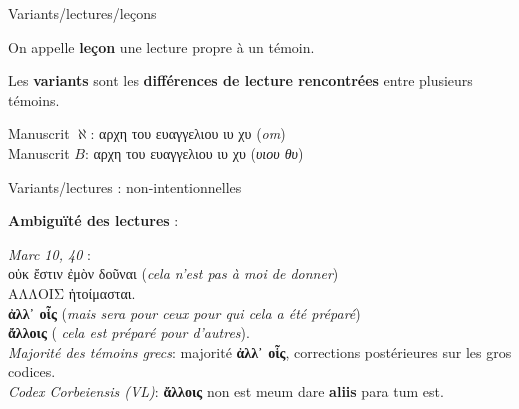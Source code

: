 \documentclass[11pt]{beamer}
\begin{document}
\begin{frame}{Variants/lectures/leçons}

\begin{alertblock}{}
On appelle \textbf{leçon} une lecture propre à un témoin.
\end{alertblock}
\pause
    \begin{alertblock}{}
    Les \textbf{variants} sont les \textbf{différences de lecture rencontrées} entre plusieurs témoins.
    \end{alertblock}
\vfill

Manuscrit $\aleph$: \textgreek{αρχη του ευαγγελιου ιυ χυ} (\emph{om})\\
Manuscrit $B$: \textgreek{αρχη του ευαγγελιου ιυ χυ (\emph{υιου θυ})}

\end{frame}

\begin{frame}{Variants/lectures : non-intentionnelles}

\textbf{Ambiguïté des lectures} :
        \begin{block}{}
\emph{Marc 10, 40} :\\
\textgreek{οὐκ ἔστιν ἐμὸν δοῦναι} (\textit{cela n'est pas à moi de donner})\\ \textgreek{ΑΛΛΟΙΣ ἡτοίμασται.} \\
        \textgreek{\textbf{ἀλλ᾽ οἷς}} (\textit{mais sera pour ceux pour qui cela a été préparé}) \\
        \textgreek{\textbf{ἄλλοις}} (\textit{ cela est préparé pour d'autres}).\\
        \vfill
        \textit{Majorité des témoins grecs}: majorité \textbf{ἀλλ᾽ οἷς}, corrections postérieures sur les gros codices.\\

        \textit{Codex Corbeiensis (VL)}: \textbf{ἄλλοις} non est meum dare \textbf{aliis} para tum est.
        \end{block}
        \end{frame}
        
\end{document}
